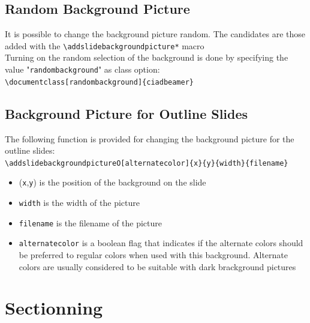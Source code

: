\documentclass[english,sectioncirclenumberstyle]{ciadbeamer}
\begin{document}
\subsection{Random Background Picture}

\begin{frame}{\subsecname}
	It is possible to change the background picture random. The candidates are those added with the \texttt{{\textbackslash}addslidebackgroundpicture*} macro \\[.25cm]
	Turning on the random selection of the background is done by specifying the value "\texttt{randombackground}" as class option: \\[.25cm]
	\texttt{{\textbackslash}documentclass[randombackground]\{ciadbeamer\}}
\end{frame}

\subsection{Background Picture for Outline Slides}

\begin{frame}{\subsecname}
	The following function is provided for changing the background picture for the outline slides: \\[.25cm]
	\texttt{{\textbackslash}addslidebackgroundpictureO[alternatecolor]\{x\}\{y\}\{width\}\{filename\}} \\[.25cm]
	\begin{itemize}
		\item (\texttt{x},\texttt{y}) is the position of the background on the slide
		\item \texttt{width} is the width of the picture
		\item \texttt{filename} is the filename of the picture
		\item \texttt{alternatecolor} is a boolean flag that indicates if the alternate colors should be preferred to regular colors when used with this background. Alternate colors are usually considered to be suitable with dark brackground pictures
	\end{itemize}
\end{frame}



\section{Sectionning}
\sectiontableofcontentslide
\end{document}
